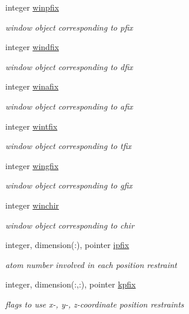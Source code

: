 \begin{DoxyCompactItemize}
integer \hyperlink{classkgeoms_aa76d85e89767ae6f676bdec36b9c940c}{winpfix}
\begin{DoxyCompactList}\small\item\em window object corresponding to pfix \end{DoxyCompactList}\item 
integer \hyperlink{classkgeoms_a4c323319977ef1ccc31b0f82ed9eac11}{windfix}
\begin{DoxyCompactList}\small\item\em window object corresponding to dfix \end{DoxyCompactList}\item 
integer \hyperlink{classkgeoms_adfe204b9072a92256edf2ae0577c0d1b}{winafix}
\begin{DoxyCompactList}\small\item\em window object corresponding to afix \end{DoxyCompactList}\item 
integer \hyperlink{classkgeoms_aeceb719263c6f11ed37a844c681c29c6}{wintfix}
\begin{DoxyCompactList}\small\item\em window object corresponding to tfix \end{DoxyCompactList}\item 
integer \hyperlink{classkgeoms_af323be093cbf37729b2880bc49379909}{wingfix}
\begin{DoxyCompactList}\small\item\em window object corresponding to gfix \end{DoxyCompactList}\item 
integer \hyperlink{classkgeoms_aa6d82acf75d8341b25f961ed6d8dd6cc}{winchir}
\begin{DoxyCompactList}\small\item\em window object corresponding to chir \end{DoxyCompactList}\item 
integer, dimension(\-:), pointer \hyperlink{classkgeoms_a2b30f0d48f82ead39fb52021f77dd4e8}{ipfix}
\begin{DoxyCompactList}\small\item\em atom number involved in each position restraint \end{DoxyCompactList}\item 
integer, dimension(\-:,\-:), pointer \hyperlink{classkgeoms_ab2178e14a7915308f33ca5a540b6dae5}{kpfix}
\begin{DoxyCompactList}\small\item\em flags to use x-\/, y-\/, z-\/coordinate position restraints \end{DoxyCompactList}\item 

\end{DoxyCompactItemize}
